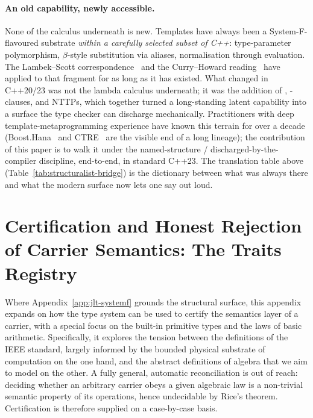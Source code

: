 \documentclass[11pt, a4paper]{article}
\begin{document}
\paragraph{An old capability, newly accessible.}
None of the calculus underneath is new.
Templates have always been a System-F-flavoured substrate \emph{within a carefully selected subset of C++}: type-parameter polymorphism, $\beta$-style substitution via  aliases, normalisation through  evaluation.
The Lambek--Scott correspondence~\cite{lambek1988introduction} and the Curry--Howard reading~\cite{wadler2015propositions} have applied to that fragment for as long as it has existed.
What changed in C++20/23 was not the lambda calculus underneath; it was the addition of , -clauses, and NTTPs, which together turned a long-standing latent capability into a surface the type checker can discharge mechanically.
Practitioners with deep template-metaprogramming experience have known this terrain for over a decade (Boost.Hana~\cite{chagnon2016hana} and CTRE~\cite{dusikova2018ctre} are the visible end of a long lineage); the contribution of this paper is to walk it under the named-structure / discharged-by-the-compiler discipline, end-to-end, in standard C++23.
The translation table above (Table~\ref{tab:structuralist-bridge}) is the dictionary between what was always there and what the modern surface now lets one say out loud.


\clearpage
\section{Certification and Honest Rejection of Carrier Semantics: The Traits Registry}
\label{sec:trait-registry}

Where Appendix~\ref{app:jlt-systemf} grounds the structural surface, this appendix expands on how the type system can be used to certify the semantics layer of a carrier, with a special focus on the built-in primitive types and the laws of basic arithmetic.
Specifically, it explores the tension between the definitions of the IEEE standard, largely informed by the bounded physical substrate of computation on the one hand, and the abstract definitions of algebra that we aim to model on the other.
A fully general, automatic reconciliation is out of reach: deciding whether an arbitrary carrier obeys a given algebraic law is a non-trivial semantic property of its operations, hence undecidable by Rice's theorem.
Certification is therefore supplied on a case-by-case basis.
\end{document}

